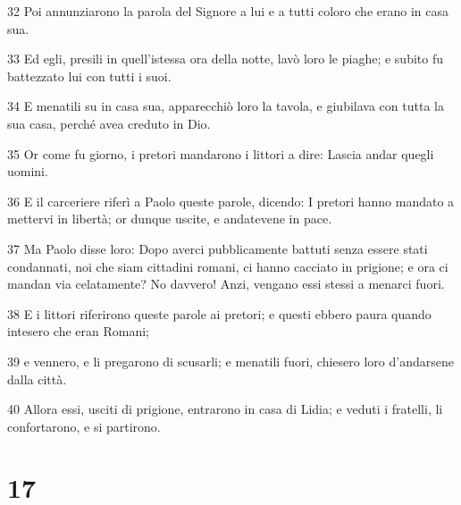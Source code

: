 \par 32 Poi annunziarono la parola del Signore a lui e a tutti coloro che erano in casa sua.
\par 33 Ed egli, presili in quell'istessa ora della notte, lavò loro le piaghe; e subito fu battezzato lui con tutti i suoi.
\par 34 E menatili su in casa sua, apparecchiò loro la tavola, e giubilava con tutta la sua casa, perché avea creduto in Dio.
\par 35 Or come fu giorno, i pretori mandarono i littori a dire: Lascia andar quegli uomini.
\par 36 E il carceriere riferì a Paolo queste parole, dicendo: I pretori hanno mandato a mettervi in libertà; or dunque uscite, e andatevene in pace.
\par 37 Ma Paolo disse loro: Dopo averci pubblicamente battuti senza essere stati condannati, noi che siam cittadini romani, ci hanno cacciato in prigione; e ora ci mandan via celatamente? No davvero! Anzi, vengano essi stessi a menarci fuori.
\par 38 E i littori riferirono queste parole ai pretori; e questi ebbero paura quando intesero che eran Romani;
\par 39 e vennero, e li pregarono di scusarli; e menatili fuori, chiesero loro d'andarsene dalla città.
\par 40 Allora essi, usciti di prigione, entrarono in casa di Lidia; e veduti i fratelli, li confortarono, e si partirono.

\chapter{17}

